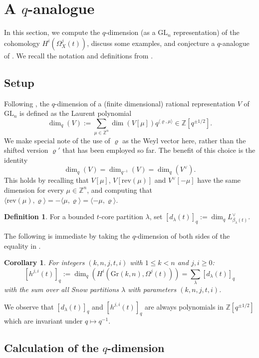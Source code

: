 \documentclass{amsart}
\newcommand\Z{\mathbb{Z}}
\theoremstyle{plain}
\newtheorem{corollary}[corollary]{Corollary}
\theoremstyle{definition}
\newtheorem{definition}[definition]{Definition}
\numberwithin{equation}{section}
\begin{document}
\section{A \texorpdfstring{$q$}{q}-analogue}
\label{sec:q}
In this section, we compute the $q$-dimension (as a $\mathrm{GL}_n$ representation) of the cohomology $H^i(\Omega_X^j(t))$, discuss some examples, and conjecture a $q$-analogue of . We recall the notation and definitions from .

\subsection{Setup}

Following \cite{Stem94}, the $q$-dimension of a (finite dimensional) rational representation $V$ of $\mathrm{GL}_n$ is defined as the Laurent polynomial
\[\dim_q(V):=\sum_{\mu\in\Z^n}\dim(V[\mu])q^{\langle\varrho,\mu\rangle}\in\Z[q^{\pm 1/2}].\]
We make special note of the use of $\varrho$ as the Weyl vector here, rather than the shifted version $\varrho'$ that has been employed so far. The benefit of this choice is the identity
\[\dim_q(V)=\dim_{q^{-1}}(V)=\dim_q(V^\vee).\]
This holds by recalling that $V[\mu]$, $V[\mathrm{rev}(\mu)]$ and $V^\vee[-\mu]$ have the same dimension for every $\mu\in\Z^n$, and computing that $\langle \mathrm{rev}(\mu),\varrho\rangle=-\langle\mu,\varrho\rangle=\langle-\mu,\varrho\rangle$.

\begin{definition}
For a bounded $t$-core partition $\lambda$, set $[d_\lambda(t)]_q:=\dim_q L_{\beta_\lambda(t)}^\vee$.
\end{definition}

The following is immediate by taking the $q$-dimension of both sides of the equality in .

\begin{corollary}
For integers $(k,n,j,t,i)$ with $1\leq k< n$ and $j,i\geq 0$:
\[[h^{j,i}(t)]_q:=\dim_q(H^i(\mathrm{Gr}(k,n),\Omega^j(t)))=\sum_\lambda [d_\lambda(t)]_q\]
with the sum over all Snow partitions $\lambda$ with parameters $(k,n,j,t,i)$.
\end{corollary}

We observe that $[d_\lambda(t)]_q$ and $[h^{j,i}(t)]_q$ are always polynomials in $\Z[q^{\pm 1/2}]$ which are invariant under $q\mapsto q^{-1}$.

\subsection{Calculation of the \texorpdfstring{$q$}{q}-dimension}
\end{document}
